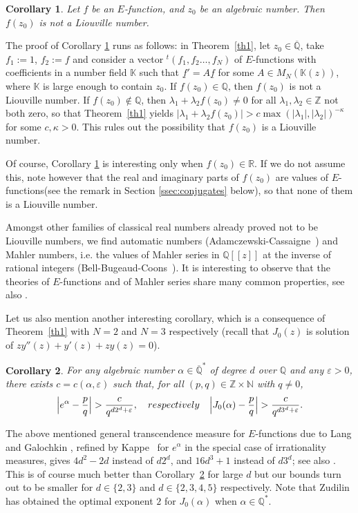 \documentclass[11pt]{article}
\numberwithin{equation}{section}
\newcommand{\lcr}{[\![}
\newcommand{\rcr}{]\!]}
\newcommand{\Efunction}{$E$\nobreakdash-func\-tion\xspace}
\newcommand{\Efunctions}{$E$\nobreakdash-func\-tions\xspace}
\newtheorem{coro}{Corollary}
\theoremstyle{definition}
\newcommand{\tra}{{}^t}
\newcommand{\Z}{\mathbb{Z}}
\newcommand{\R}{\mathbb{R}}
\newcommand{\K}{\mathbb{K}}
\newcommand{\Qbar}{\overline{\mathbb Q}}
\begin{document}
\begin{coro} \label{corliouville}
Let $f$ be an \Efunction, and $z_0$ be an algebraic number. Then $f(z_0)$ is not a Liouville number.
\end{coro}
The proof of Corollary \ref{corliouville} runs as follows: in Theorem~\ref{th1}, let $z_0\in \Qbar$, take $f_1:=1$, $f_2:=f$ and consider a vector $\tra (f_1, f_2\ldots, f_N)$ of \Efunctions with coefficients in a number field $\K$ such that $\underline f '=A\underline f$ for some $A\in M_N(\K(z))$, where $\K$ is large enough to contain $z_0$. If $f(z_0)\in \mathbb Q$, then $f(z_0)$ is not a Liouville number.
If $f(z_0)\notin \mathbb Q$, then $\lambda_1+\lambda_2 f(z_0)\neq 0$ for all $\lambda_1, \lambda_2\in\Z$ not both zero, so that Theorem~\ref{th1} yields
$\vert \lambda_1+\lambda_2 f(z_0)\vert>c\max(\vert \lambda_1\vert, \vert \lambda_2\vert)^{-\kappa}$ for some $c,\kappa>0$. This rules out the possibility that $f(z_0)$ is a Liouville number.

Of course, Corollary \ref{corliouville} is interesting only when $f(z_0)\in\R$. If we do not assume this, note however that the real and imaginary parts of $f(z_0)$ are values of \Efunctions (see the remark in Section \ref{ssec:conjugates} below), so that none of them is a Liouville number.

Amongst other families of classical real numbers already proved not to be Liouville numbers, we find automatic numbers (Adamczewski-Cassaigne~\cite{ac}) and Mahler numbers, i.e. the values of Mahler series in $\mathbb Q\lcr z\rcr$ at the inverse of rational integers (Bell-Bugeaud-Coons~\cite{bbc}). It is interesting to observe that the theories of \Efunctions and of Mahler series share many common properties, see also \cite{AF}.

Let us also mention another interesting corollary, which is a consequence of Theorem~\ref{th1} with $N=2$ and $N=3$ respectively (recall that $J_0(z)$ is solution of $zy''(z)+y'(z)+zy(z)=0$).
\begin{coro} \label{coro:mesexpj0}
For any algebraic number $\alpha\in \Qbar^*$ of degree $d$ over $\mathbb Q$ and any $\varepsilon>0$, there exists $c=c(\alpha,\varepsilon)$ such that, for all $(p,q)\in \Z\times \mathbb N$ with $q\neq 0$,
\[
\Big \vert e^{\alpha}-\frac pq\Big\vert > \frac{c}{q^{d2^d+\varepsilon}},
\quad \textup{
respectively} \quad
\Big \vert J_0(\alpha)-\frac pq\Big\vert >\frac{c}{q^{d3^d+\varepsilon}}.
\]
\end{coro}
The above mentioned general transcendence measure for \Efunctions due to Lang and Galochkin \cite[p.\,238, Th.\,5.29 \& remarks]{EMS},
refined by Kappe~\cite{kappe} for $e^{\alpha}$ in the special case of irrationality measures, gives $4d^2-2d$ instead of $d2^d$, and $16d^3+1$ instead of $d3^d$; see also \cite[p.\,404]{Shidlovskiilivre}. This is of course much better than Corollary~\ref{coro:mesexpj0} for large $d$ but our bounds turn out to be smaller for $d\in \{2,3\}$ and $d\in \{2,3,4,5\}$ respectively. Note that Zudilin \cite{zudilin} has obtained the optimal exponent $2$ for $J_0(\alpha)$ when $\alpha \in \mathbb{Q}^*$.
\end{document}
